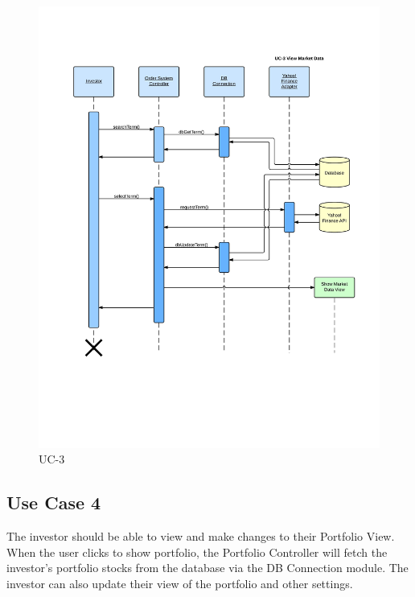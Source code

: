 \begin{figure}[H]
\centering
\includegraphics[width=5.5in]{./img/inter/uc3.jpg}
\caption{UC-3}
\end{figure}

\subsection{Use Case 4}
The investor should be able to view and make changes to their Portfolio View.
When the user clicks to show portfolio, the Portfolio Controller will fetch the
investor’s portfolio stocks from the database via the DB Connection module. The
investor can also update their view of the portfolio and other settings.

